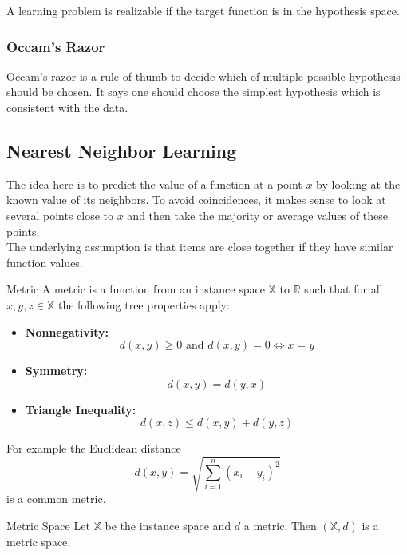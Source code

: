\documentclass[english]{panikzettel}
\begin{document}
A learning problem is realizable if the target function is in the hypothesis space.

\subsubsection{Occam's Razor}
Occam's razor is a rule of thumb to decide which of multiple possible hypothesis should be chosen. It says one should choose the simplest hypothesis which is consistent with the data.


\subsection{Nearest Neighbor Learning}
The idea here is to predict the value of a function at a point $x$ by looking at the known value of its neighbors. To avoid coincidences, it makes sense to look at several points close to $x$ and then take the majority or average values of these points.\\
The underlying assumption is that items are close together if they have similar function values.

\begin{halfboxl}
\vspace{-\baselineskip}
\begin{defi}{Metric}
A metric is a function from an instance space $\mathbb{X}$ to $\mathbb{R}$ such that for all $x,y,z\in\mathbb{X}$ the following tree properties apply:
\begin{itemize}
\item \textbf{Nonnegativity:}
\vspace{-0.5\baselineskip}
\[
d(x,y)\geq 0 \text{ and } d(x,y)=0 \iff x=y
\]
\item \textbf{Symmetry:}
\vspace{-0.5\baselineskip}
\[
d(x,y)=d(y,x)
\]
\item \textbf{Triangle Inequality:}
\vspace{-0.5\baselineskip}
\[
d(x,z)\leq d(x,y)+d(y,z)
\]
\end{itemize}
\end{defi}
\end{halfboxl}
\begin{halfboxr}
\vspace{-\baselineskip}
For example the Euclidean distance
\[
d(x,y)=\sqrt{\sum_{i=1}^n(x_i-y_i)^2}
\]
is a common metric.\\


\begin{defi}{Metric Space}
Let $\mathbb{X}$ be the instance space and $d$ a metric. Then $(\mathbb{X}, d)$ is a metric space.
\end{defi}
\end{halfboxr}
\end{document}
